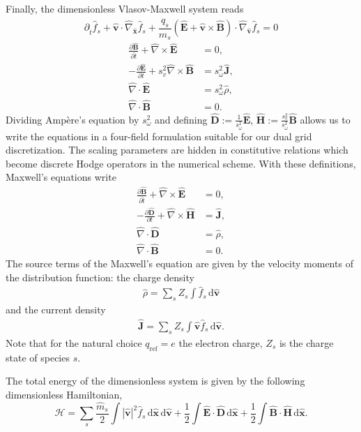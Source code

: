 \documentclass[english]{article}
\newcommand{\bx}{\textbf{x}}
\newcommand{\bv}{\textbf{v}}
\newcommand{\bB}{\textbf{B}}
\newcommand{\bH}{\textbf{H}}
\newcommand{\bE}{\textbf{E}}
\newcommand{\bD}{\textbf{D}}
\newcommand{\bJ}{\textbf{J}}
\newcommand{\du}{\,\mathrm{d}}
\newcommand{\qr}{q_{\mathrm{ref}}}
\newcommand{\nablaht}{\hat{\nabla}}
\newcommand{\nablaxht}{\hat{\nabla}_{\xht}}
\newcommand{\nablavht}{\hat{\nabla}_{\vht}}
\newcommand{\tht}{\hat{t}}
\newcommand{\xht}{\hat{\bx}}
\newcommand{\vht}{\hat{\bv}}
\newcommand{\qht}{\hat{q}}
\newcommand{\mht}{\hat{m}}
\newcommand{\Eht}{\hat{\bE}}
\newcommand{\Dht}{\hat{\bD}}
\newcommand{\Bht}{\hat{\bB}}
\newcommand{\Hht}{\hat{\bH}}
\newcommand{\Jht}{\hat{\bJ}}
\newcommand{\rhoht}{\hat{\rho}}
\newcommand{\fht}{\hat{f}}
\begin{document}
Finally, the dimensionless Vlasov-Maxwell system reads
\begin{equation}\label{eq:Vlasovt}
	\partial_{\tht} \fht_s + \vht \cdot \nablaxht \fht_s +  \frac{\qht_s}{\mht_s} \left( \Eht + \vht \times \Bht \right) \cdot \nablavht \fht_s = 0
\end{equation}
\begin{align}
	\frac{\partial \Bht}{\partial \tht} + \nablaht \times \Eht      & = 0 ,               \\
	-  \frac{\partial \Eht}{\partial t} + s_v^2\nablaht \times \Bht & = s_\omega^2\Jht ,  \\
	\nablaht \cdot \Eht                                             & = s_\omega^2\rhoht, \\
	\nablaht \cdot \Bht                                             & = 0.
\end{align}
Dividing Amp\`ere's equation by $s_\omega^2$ and defining $\Dht := \frac{1}{s_\omega^2} \Eht$, $\Hht := \frac{s_v^2}{s_\omega^2} \Bht$ allows us to write the equations in a four-field formulation suitable for our dual grid discretization. The scaling parameters are hidden in constitutive relations which become discrete Hodge operators in the numerical scheme. With these definitions, Maxwell's equations write
\begin{align}
	\frac{\partial \Bht}{\partial \tht} + \nablaht \times \Eht & = 0 ,     \\
	-  \frac{\partial \Dht}{\partial t} + \nablaht \times \Hht & = \Jht ,  \\
	\nablaht \cdot \Dht                                        & = \rhoht, \\
	\nablaht \cdot \Bht                                        & = 0.
\end{align}
The source terms of the Maxwell's equation are given by the velocity moments of the distribution function: the charge density
\begin{align*}
	\rhoht= \sum_s Z_s \int \fht_s \du\vht
\end{align*}
and the current density
\begin{align*}
	\Jht =\sum_s Z_s\int \vht \fht_s \du\vht.
\end{align*}
Note that for the natural choice $\qr=e$ the electron charge, $Z_s$ is the charge state of species $s$.

The total energy of the dimensionless system is given by the following dimensionless Hamiltonian,
\begin{equation}\label{eq:hamiltoniant}
	\mathcal{H}=\sum_s\frac{\mht_s}{2}\int |\vht|^2 \fht_s \du\xht \du\vht + \frac{1}{2} \int \Eht \cdot \Dht \du\xht + \frac{1}{2} \int \Bht \cdot \Hht \du\xht.
\end{equation}
\end{document}
